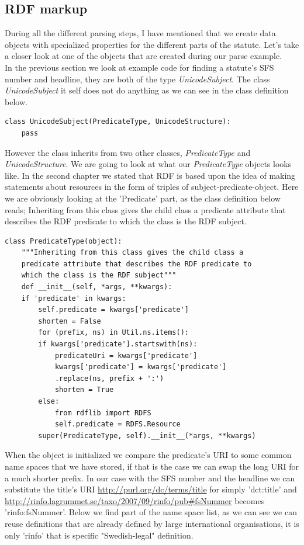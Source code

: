 \subsection{RDF markup }
During all the different parsing steps, I have mentioned that we create data objects with specialized properties for the different parts of the statute. Let's take a closer look at one of the objects that are created during our parse example.\\
In the previous section we look at example code for finding a statute's SFS number and headline, they are both of the type \textit{UnicodeSubject}. The class \textit{UnicodeSubject} it self does not do anything as we can see in the class definition below.\\
\begin{verbatim}
class UnicodeSubject(PredicateType, UnicodeStructure):
	pass
\end{verbatim} 
\linebreak
\newline
However the class inherits from two other classes, \textit{PredicateType} and \textit{UnicodeStructure}. We are going to look at what our \textit{PredicateType} objects looks like. In the second chapter we stated that RDF is based upon the idea of making statements about resources in the form of triples of subject-predicate-object. Here we are obviously looking at the 'Predicate' part, as the class definition below reads; Inheriting from this class gives the child class a predicate attribute that describes the RDF predicate to which the class is the RDF subject.\\    
\begin{verbatim}
class PredicateType(object):
    """Inheriting from this class gives the child class a 
    predicate attribute that describes the RDF predicate to 
    which the class is the RDF subject"""
    def __init__(self, *args, **kwargs):
	if 'predicate' in kwargs:
	    self.predicate = kwargs['predicate']
	    shorten = False
	    for (prefix, ns) in Util.ns.items():
		if kwargs['predicate'].startswith(ns):
		    predicateUri = kwargs['predicate']
		    kwargs['predicate'] = kwargs['predicate']
			.replace(ns, prefix + ':')	
		    shorten = True
		else:
		    from rdflib import RDFS
		    self.predicate = RDFS.Resource
	    super(PredicateType, self).__init__(*args, **kwargs)
\end{verbatim} 
\linebreak
\newline
When the object is initialized we compare the predicate's URI to some common name spaces that we have stored, if that is the case we can swap the long URI for a much shorter prefix. In our case with the SFS number and the headline we can substitute the title's URI \url{http://purl.org/dc/terms/title} for simply 'dct:title' and \url{http://rinfo.lagrummet.se/taxo/2007/09/rinfo/pub#fsNummer} becomes 'rinfo:fsNummer'. Below we find part of the name space list, as we can see we can reuse definitions that are already defined by large international organisations, it is only 'rinfo' that is specific "Swedish-legal" definition.     

